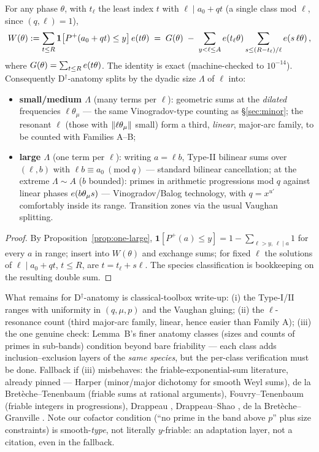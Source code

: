 \begin{proposition}\label{prop:species}
\statusPM\quad
For any phase $\theta$, with $t_\ell$ the least index $t$ with
$\ell\mid a_0+qt$ (a single class mod $\ell$, since $(q,\ell)=1$),
\[
W(\theta):=\sum_{t\le R}\mathbf 1\big[P^{+}(a_0+qt)\le y\big]\,e\!\left(t\theta\right)
\;=\;G(\theta)\;-\;\sum_{y<\ell\le A}e\!\left(t_\ell\theta\right)
\sum_{s\le(R-t_\ell)/\ell}e\!\left(s\,\ell\theta\right),
\]
where $G(\theta)=\sum_{t\le R}e\!\left(t\theta\right)$. The identity is exact
(machine-checked to $10^{-14}$). Consequently D$^\dagger$-anatomy splits
by the dyadic size $\Lambda$ of $\ell$ into:
\begin{itemize}
\item\textbf{small/medium $\Lambda$} (many terms per $\ell$): geometric
sums at the \emph{dilated} frequencies $\ell\theta_\mu$ --- the same
Vinogradov-type counting as \S\ref{sec:minor}; the resonant $\ell$
(those with $\left\| \ell\theta_\mu\right\|$ small) form a third, \emph{linear},
major-arc family, to be counted with Families A--B;
\item\textbf{large $\Lambda$} (one term per $\ell$): writing
$a=\ell b$, Type-II bilinear sums over $(\ell,b)$ with
$\ell b\equiv a_0\ (\mathrm{mod}\ q)$ --- standard bilinear
cancellation; at the extreme $\Lambda\sim A$ ($b$ bounded): primes in
arithmetic progressions mod $q$ against linear phases
$e\!\left(b\theta_\mu s\right)$ --- Vinogradov/Balog technology, with $q=x^{u'}$
comfortably inside its range. Transition zones via the usual Vaughan
splitting.
\end{itemize}
\end{proposition}

\begin{proof}
By Proposition~\ref{prop:one-large},
$\mathbf 1[P^+(a)\le y]=1-\sum_{\ell>y,\,\ell\mid a}1$ for every $a$ in
range; insert into $W(\theta)$ and exchange sums; for fixed $\ell$ the
solutions of $\ell\mid a_0+qt$, $t\le R$, are $t=t_\ell+s\ell$. The
species classification is bookkeeping on the resulting double sum.
\end{proof}

\begin{remark}
\statusN\quad
What remains for D$^\dagger$-anatomy is classical-toolbox write-up:
(i) the Type-I/II ranges with uniformity in $(q,\mu,p)$ and the Vaughan
gluing; (ii) the $\ell$-resonance count (third major-arc family, linear,
hence easier than Family A); (iii) the one genuine check: Lemma~B's
finer anatomy classes (sizes and counts of primes in sub-bands)
condition beyond bare friability --- each class adds
inclusion--exclusion layers of the \emph{same species}, but the
per-class verification must be done. Fallback if (iii) misbehaves: the
friable-exponential-sum literature, already pinned --- Harper
\cite{Harper16} (minor/major dichotomy for smooth Weyl sums), de la
Bret\`eche--Tenenbaum \cite{dlBT07} (friable sums at rational
arguments), Fouvry--Tenenbaum \cite{FT91} (friable integers in
progressions), Drappeau \cite{Drap15}, Drappeau--Shao \cite{DS16}, de la
Bret\`eche--Granville \cite{dlBG22}. Note our cofactor condition (``no
prime in the band above $p$'' plus size constraints) is smooth-\emph{type},
not literally $y$-friable: an adaptation layer, not a citation, even in
the fallback.
\end{remark}
